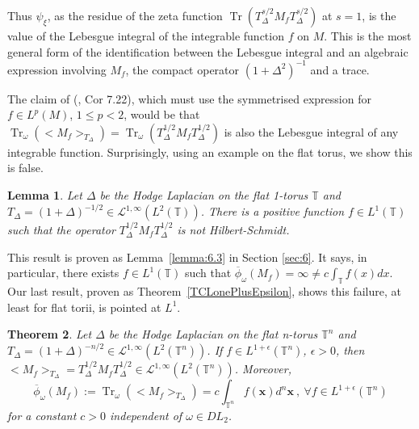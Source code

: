 \documentclass[final,1p]{elsarticle}
\numberwithin{equation}{section}
\theoremstyle{plain}
\newtheorem{thm}{Theorem}[section]
\newtheorem{lemma}[thm]{Lemma}
\theoremstyle{definition}
\begin{document}
Thus $\psi_{\ensuremath{\xi}}$, as the residue of the zeta function
$\operatorname{Tr}(T_\Delta^{s/2} M_f T_\Delta^{s/2})$ at $s=1$, is the value of the Lebesgue integral of the integrable function $f$ on $M$.
This is the most general form of the identification between the
Lebesgue integral and an algebraic expression involving
$M_f$, the compact operator $(1+\Delta^2)^{-1}$ and a trace.

The claim of (\cite{GBVF}, Cor 7.22), which must use the symmetrised expression
for $f \in L^p(M)$, $1 \leq p < 2$, would be that $\operatorname{Tr}_\omega({\ensuremath{\big< {M_f} \big>_{{T_\Delta}}}}) = \operatorname{Tr}_\omega(T_\Delta^{1/2} M_f T_\Delta^{1/2})$
is also the Lebesgue integral of any integrable function.
Surprisingly, using an example on the flat torus,
we show this is false.

\begin{lemma} \label{lemma:counterex}
Let $\Delta$ be the Hodge Laplacian on the flat 1-torus ${\ensuremath{\mathbb{T}}}$ and $T_\Delta = (1+\Delta)^{-1/2} \in \mathcal{L}^{1,\infty}(L^2({\ensuremath{\mathbb{T}}}))$.
There is a positive function $f \in L^1({\ensuremath{\mathbb{T}}})$
such that the operator $T_\Delta^{1/2} M_f T_\Delta^{1/2}$ is not Hilbert-Schmidt.
\end{lemma}

This result is proven as Lemma~\ref{lemma:6.3} in Section \ref{sec:6}.  It says, in particular,
there exists $f \in L^1({\ensuremath{\mathbb{T}}})$ such that $\overline{\phi}_{\omega}(M_f) = \infty \not= c \int_{\ensuremath{\mathbb{T}}} f(x) dx$.
Our last result, proven as Theorem~\ref{TCLonePlusEpsilon},
shows this failure, at least for flat torii, is pointed
at $L^1$.

\begin{thm} \label{thm:1b3} Let $\Delta$ be the Hodge Laplacian on the flat n-torus ${\ensuremath{\mathbb{T}}}^n$ and $T_\Delta = (1+\Delta)^{-n/2} \in \mathcal{L}^{1,\infty}(L^2({\ensuremath{\mathbb{T}}}^n))$.  If $f \in L^{1+\epsilon}({\ensuremath{\mathbb{T}}}^n)$,  $\epsilon > 0$, then ${\ensuremath{\big< {M_f} \big>_{{T_{\Delta}}}}} = T_\Delta^{1/2} M_f
  T_\Delta^{1/2} \in \mathcal{L}^{1,\infty}(L^2({\ensuremath{\mathbb{T}}}^n))$.  Moreover,
$$
\overline{\phi}_{\omega}(M_f) := \operatorname{Tr}_{\omega}({\ensuremath{\big< {M_f} \big>_{{T_{\Delta}}}}}) = c \int_{{\ensuremath{\mathbb{T}}}^n} f(\mathbf{x}) d^n \mathbf{x} \ , \ {\ensuremath{\forall}} f \in L^{1+\epsilon}({\ensuremath{\mathbb{T}}}^n)
$$
for a constant $c > 0$ independent of $\omega \in DL_2$.
\end{thm}
\end{document}

